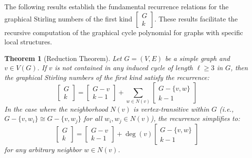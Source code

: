 \documentclass{amsart}
\newtheorem{theorem}{Theorem}[section]
\theoremstyle{definition}
\def\st#1#2{\begin{bmatrix} #1 \\ #2 \end{bmatrix}}
\begin{document}
The following results establish the fundamental recurrence relations for the graphical Stirling numbers of the first kind $\st{G}{k}$. These results facilitate the recursive computation of the graphical cycle polynomial for graphs with specific local structures.


\begin{theorem}[Reduction Theorem]\label{thm:general_reduction}
Let $G = (V, E)$ be a simple graph and $v \in V(G)$. If $v$ is not contained in any induced cycle of length $\ell \geq 3$ in $G$, then the graphical Stirling numbers of the first kind satisfy the recurrence:
\begin{equation*}
    \st{G}{k} = \st{G - v}{k - 1} + \sum_{w \in N(v)} \st{G - \{v,w\}}{k - 1}
\end{equation*}
In the case where the neighborhood $N(v)$ is vertex-transitive within $G$ (i.e., $G - \{v,w_i\} \cong G - \{v,w_j\}$ for all $w_i, w_j \in N(v)$), the recurrence simplifies to:
\begin{equation*}
    \st{G}{k} = \st{G-v}{k-1} + \deg(v) \st{G - \{v,w\}}{k-1}
\end{equation*}
for any arbitrary neighbor $w \in N(v)$.
\end{theorem}
\end{document}
